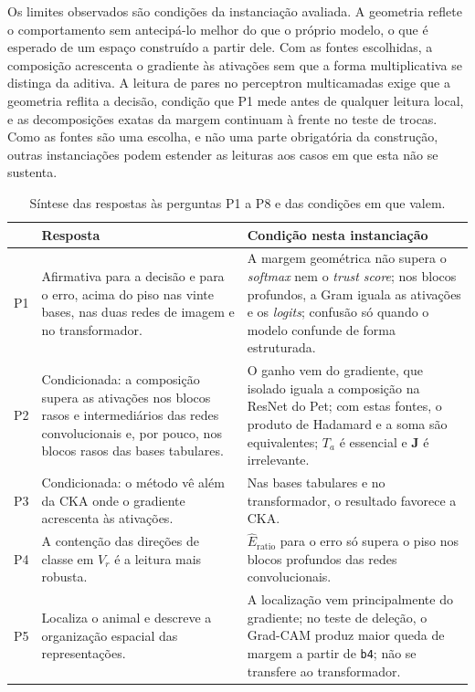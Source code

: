 Os limites observados são condições da instanciação avaliada. A geometria reflete o comportamento sem antecipá-lo melhor do que o próprio modelo, o que é esperado de um espaço construído a partir dele. Com as fontes escolhidas, a composição acrescenta o gradiente às ativações sem que a forma multiplicativa se distinga da aditiva. A leitura de pares no perceptron multicamadas exige que a geometria reflita a decisão, condição que P1 mede antes de qualquer leitura local, e as decomposições exatas da margem continuam à frente no teste de trocas. Como as fontes são uma escolha, e não uma parte obrigatória da construção, outras instanciações podem estender as leituras aos casos em que esta não se sustenta.

\begin{table}[pos=htbp]
\centering
\caption{Síntese das respostas às perguntas P1 a P8 e das condições em que valem.}
\label{tab:res_sintese}
\footnotesize
\begin{tabular}{p{0.7cm}p{5.4cm}p{7.2cm}}
\hline
 & Resposta & Condição nesta instanciação \\
\hline
P1 & Afirmativa para a decisão e para o erro, acima do piso nas vinte bases, nas duas redes de imagem e no transformador. & A margem geométrica não supera o \textit{softmax} nem o \textit{trust score}; nos blocos profundos, a Gram iguala as ativações e os \textit{logits}; confusão só quando o modelo confunde de forma estruturada. \\
P2 & Condicionada: a composição supera as ativações nos blocos rasos e intermediários das redes convolucionais e, por pouco, nos blocos rasos das bases tabulares. & O ganho vem do gradiente, que isolado iguala a composição na ResNet do Pet; com estas fontes, o produto de Hadamard e a soma são equivalentes; $T_a$ é essencial e $\mathbf{J}$ é irrelevante. \\
P3 & Condicionada: o método vê além da CKA onde o gradiente acrescenta às ativações. & Nas bases tabulares e no transformador, o resultado favorece a CKA. \\
P4 & A contenção das direções de classe em $V_r$ é a leitura mais robusta. & $\widehat{E}_{\mathrm{ratio}}$ para o erro só supera o piso nos blocos profundos das redes convolucionais. \\
P5 & Localiza o animal e descreve a organização espacial das representações. & A localização vem principalmente do gradiente; no teste de deleção, o Grad-CAM produz maior queda de margem a partir de \texttt{b4}; não se transfere ao transformador. \\

\end{tabular}
\end{table}
